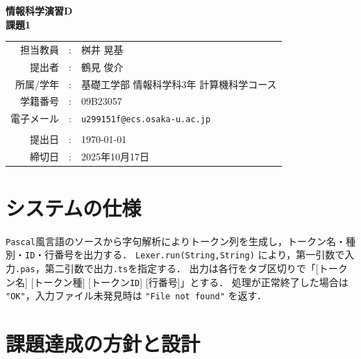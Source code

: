 \documentclass[a4j,10pt]{jarticle}
\makeatletter
\newcommand{\teacherName}{桝井 晃基}
\newcommand{\studentName}{鶴見 俊介}
\newcommand{\studentAff}{基礎工学部 情報科学科3年 計算機科学コース}
\newcommand{\studentID}{09B23057}
\newcommand{\studentEmail}{u299151f@ecs.osaka-u.ac.jp}
\newcommand{\submitted}{\today}
\newcommand{\deadline}{2025年10月17日}
\makeatother
\begin{document}
\begin{titlepage}
\begin{center}
{\Huge\bfseries 情報科学演習D} \\
\vspace{1cm}
{\LARGE\bfseries 課題1}
\vspace{5cm}

{\large
\begin{tabular}{rcl}
担当教員 & : & \teacherName \\
提出者   & : & \studentName \\
所属/学年   & : & \studentAff\\
学籍番号 & : & \studentID \\
電子メール & : & \texttt{\studentEmail}\\
&& \\
提出日 & : & \submitted \\
締切日 & : & \deadline
\end{tabular}
}
\end{center}
\end{titlepage}

\setcounter{tocdepth}{2}
\newpage

% 


\section{システムの仕様}
\verb|Pascal|風言語のソースから字句解析によりトークン列を生成し，トークン名・種別・\verb|ID|・行番号を出力する．
\verb|Lexer.run(String,String)| により，第一引数で入力\verb|.pas|，第二引数で出力\verb|.ts|を指定する．
出力は各行をタブ区切りで「[トークン名] [トークン種] [トークン\verb|ID|] [行番号]」とする．
処理が正常終了した場合は \verb|"OK"|，入力ファイル未発見時は \verb|"File not found"| を返す．

\section{課題達成の方針と設計}
\end{document}
